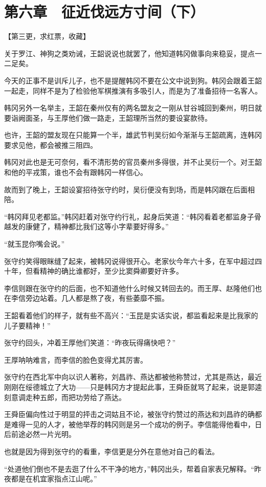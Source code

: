\section{第六章　征近伐远方寸间（下）}

【第三更，求红票，收藏】

关于罗江、神狗之类劝诫，王韶说说也就罢了，他知道韩冈做事向来稳妥，提点一二足矣。

今天的正事不是训斥儿子，也不是提醒韩冈不要在公文中说到狗。韩冈会跟着王韶一起走，同样不是为了检验他军棋推演有多吸引人，而是为了准备招待一名客人。

韩冈另外一名举主，王韶在秦州仅有的两名盟友之一刚从甘谷城回到秦州，明日就要诣阙面圣，与王厚他们做一路走，王韶理所当然的要设宴款待。

也许，王韶的盟友现在只能算一个半，雄武节判吴衍如今渐渐与王韶疏离，连韩冈要求见他，都会被推三阻四。

韩冈对此也是无可奈何，看不清形势的官员秦州多得很，并不止吴衍一个。对王韶和他的平戎策，谁也不会有跟韩冈一样信心。

故而到了晚上，王韶设宴招待张守约时，吴衍便没有到场，而是韩冈跟在后面相陪。

“韩冈拜见老都监。”韩冈赶着对张守约行礼，起身后笑道：“韩冈看着老都监身子骨越发的康健了，精神都比我们这等小字辈要好得多。”

“就玉昆你嘴会说。”

张守约笑得眼眯缝了起来，被韩冈说得很开心。老家伙今年六十多，在军中超过四十年，但看精神的确比谁都好，至少比窦舜卿要好许多。

李信则跟在张守约的后面，也不知道他什么时候又转回去的。而王厚、赵隆他们也在李信旁边站着。几人都是熬了夜，有些萎靡不振。

王韶看着他们的样子，就有些不高兴：“玉昆是实话实说，都监看起来是比我家的儿子要精神！”

张守约回头，冲着王厚他们笑道：“昨夜玩得痛快吧？”

王厚呐呐难言，而李信的脸色变得尤其厉害。

张守约在西北军中向以识人著称，刘昌祚、燕达都被他称赞过，尤其是燕达，最近刚刚在绥德城立了大功——只是韩冈方才提起此事，王舜臣就骂了起来，说是郭逵刻意调走种五郎，而把功劳给了燕达。

王舜臣偏向性过于明显的抨击之词姑且不论，被张守约赞过的燕达和刘昌祚的确都是难得一见的人才，被他举荐的韩冈则是另一个成功的例子。李信能得他看中，日后前途必然一片光明。

也就是因为得到张守约的看重，李信更是分外在意他对自己的看法。

“处道他们倒也不是去逛了什么不干净的地方，”韩冈出头，帮着自家表兄解释。“昨夜都是在机宜家指点江山呢。”

